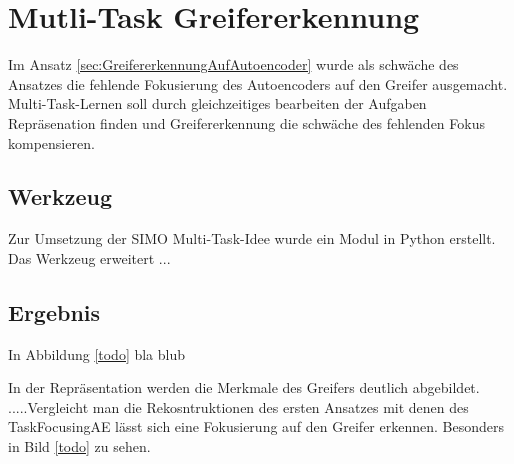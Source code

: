 	
	
	\section{Mutli-Task Greifererkennung}
	\label{sec:MultiTaskGreifererkennung}
	Im Ansatz \ref{sec:GreifererkennungAufAutoencoder} wurde als schwäche des Ansatzes die fehlende Fokusierung des Autoencoders auf den Greifer ausgemacht. Multi-Task-Lernen soll durch gleichzeitiges bearbeiten der Aufgaben Repräsenation finden und Greifererkennung die schwäche des fehlenden Fokus kompensieren.   
	\subsection{Werkzeug}
	Zur Umsetzung der SIMO Multi-Task-Idee wurde ein Modul in Python erstellt. Das Werkzeug erweitert ...  
	\subsection{Ergebnis}
	In Abbildung \ref{todo} bla blub
	
	In der Repräsentation werden die Merkmale des Greifers deutlich abgebildet. .....Vergleicht man die Rekosntruktionen des ersten Ansatzes mit denen des TaskFocusingAE lässt sich eine Fokusierung auf den Greifer erkennen. Besonders in Bild \ref{todo} zu sehen.
	
